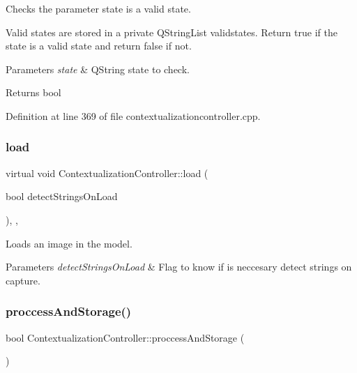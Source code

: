 Checks the parameter state is a valid state. 

Valid states are stored in a private Q\+String\+List validstates. Return true if the state is a valid state and return false if not. 
\begin{DoxyParams}{Parameters}
{\em state} & Q\+String state to check. \\
\hline
\end{DoxyParams}
\begin{DoxyReturn}{Returns}
bool 
\end{DoxyReturn}


Definition at line 369 of file contextualizationcontroller.\+cpp.

\mbox{\label{classContextualizationController_a3b93cb8ddf7ec41936d0e3ab980644eb}} 
\subsubsection{\texorpdfstring{load}{load}}
{\footnotesize\ttfamily virtual void Contextualization\+Controller\+::load (\begin{DoxyParamCaption}\item[{bool}]{detect\+Strings\+On\+Load }\end{DoxyParamCaption})\hspace{0.3cm}{\ttfamily [protected]}, {}, {\ttfamily [slot]}}



Loads an image in the model. 


\begin{DoxyParams}{Parameters}
{\em detect\+Strings\+On\+Load} & Flag to know if is neccesary detect strings on capture. \\
\hline
\end{DoxyParams}
\mbox{\label{classContextualizationController_a0ec0241ee096fa917e3ab7de448e5509}} 
\subsubsection{\texorpdfstring{proccess\+And\+Storage()}{proccessAndStorage()}}
{\footnotesize\ttfamily bool Contextualization\+Controller\+::proccess\+And\+Storage (\begin{DoxyParamCaption}{ }\end{DoxyParamCaption})\hspace{0.3cm}{\ttfamily [protected]}}



